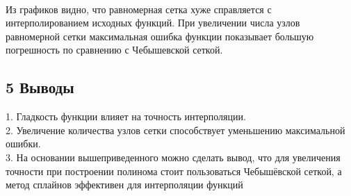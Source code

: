 \documentclass[12pt]{article}
\begin{document}
\newpage
\\Из графиков видно, что равномерная сетка хуже справляется с интерполированием
исходных функций. При увеличении числа узлов равномерной сетки максимальная ошибка функции показывает большую погрешность по сравнению с Чебышевской сеткой. 
\subsection*{5 Выводы}
\par 1. Гладкость функции влияет на точность интерполяции.
\\2. Увеличение количества узлов сетки способствует уменьшению максимальной ошибки. 
\\3. На основании вышеприведенного можно сделать вывод, что для увеличения точности при построении полинома стоит пользоваться Чебышёвской сеткой, а метод сплайнов эффективен для интерполяции функций
\end{document}

